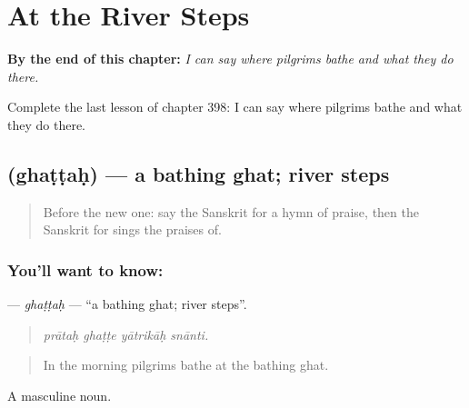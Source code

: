 
\chapter{At the River Steps}
\label{ch:sa-at-the-river-steps}

\begin{chapteropening}
\textbf{By the end of this chapter:} \emph{I can say where pilgrims bathe and what they do there.}

Complete the last lesson of chapter 398: I can say where pilgrims bathe and what they do there.
\end{chapteropening}

\section[\texorpdfstring{\sk{घट्टः} (ghaṭṭaḥ)}{घट्टः (ghaṭṭaḥ)}]{ (ghaṭṭaḥ) — a bathing ghat; river steps}

\label{lesson:SA-C398-ghattah}



\begin{quote}
Before the new one: say the Sanskrit for a hymn of praise, then the Sanskrit for sings the praises of.
\end{quote}

\subsection*{You'll want to know: }
\textbf{} — \emph{ghaṭṭaḥ} — \textquotedblleft{}a bathing ghat; river steps\textquotedblright{}.

\begin{quote}
   
\end{quote}

\begin{quote}
\emph{prātaḥ ghaṭṭe yātrikāḥ snānti.}
\end{quote}

\begin{quote}
In the morning pilgrims bathe at the bathing ghat.
\end{quote}

A masculine noun.

